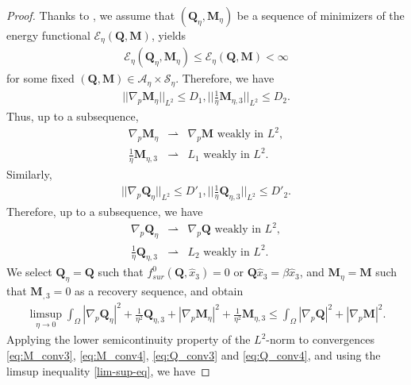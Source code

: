 \documentclass[10pt,a4paper]{amsart}
\def \Mvec{\mathbf{M}}
\def\Qvec{\mathbf{Q}}
\begin{document}
\begin{proof}
Thanks to , we assume that $\left(\Qvec_{\eta}, \Mvec_{\eta}\right)$ be a sequence of minimizers of the energy functional $\mathcal{E}_{\eta}\left(\Qvec, \Mvec\right)$, yields
\begin{eqnarray}
\mathcal{E}_{\eta}\left(\Qvec_{\eta}, \Mvec_{\eta}\right)\le\mathcal{E}_{\eta}\left(\Qvec, \Mvec\right)<\infty\label{eq:bound}
\end{eqnarray}
for some fixed $\left(\Qvec, \Mvec\right)\in \mathcal{A}_{\eta}\times\mathcal{S}_{\eta}$. Therefore, we have
\begin{eqnarray}
||\nabla_p\Mvec_{\eta}||_{L^2}\le D_1, \bigg|\bigg|\frac{1}{\eta}\Mvec_{\eta,3}\bigg|\bigg|_{L^2}\le D_2.\label{eq:M_conv1}
\end{eqnarray}
Thus, up to a subsequence,
\begin{eqnarray}
\nabla_p\Mvec_{\eta}&\rightharpoonup&\nabla_p\Mvec \mbox{ weakly in } L^2,\label{eq:M_conv3}\\
\frac{1}{\eta}\Mvec_{\eta,3}&\rightharpoonup& L_1  \mbox{ weakly in } L^2.\label{eq:M_conv4}
\end{eqnarray}
Similarly,
\begin{eqnarray}
||\nabla_p\Qvec_{\eta}||_{L^2}\le D'_1, \bigg|\bigg|\frac{1}{\eta}\Qvec_{\eta,3}\bigg|\bigg|_{L^2}\le D'_2.\label{eq:Q_conv2}
\end{eqnarray}
Therefore, up to a subsequence, we have
\begin{eqnarray}
\nabla_p\Qvec_{\eta}&\rightharpoonup&\nabla_p\Qvec \mbox{ weakly in } L^2,\label{eq:Q_conv3}\\
\frac{1}{\eta}\Qvec_{\eta,3}&\rightharpoonup& L_2  \mbox{ weakly in } L^2.\label{eq:Q_conv4}
\end{eqnarray}
We select $\Qvec_{\eta}=\Qvec$ such that $f^0_{sur}\left(\Qvec, \hat{x}_3\right)=0$ or $\Qvec\hat{x}_3=\beta\hat{x}_3$, and $\Mvec_{\eta}=\Mvec$ such that $\Mvec_{,3}=0$ as a recovery sequence, and obtain
\begin{eqnarray}
\limsup_{\eta\rightarrow 0}\int_{\Omega}|\nabla_p\Qvec_{\eta}|^2+\frac{1}{\eta^2}\Qvec_{\eta,3}+|\nabla_p\Mvec_{\eta}|^2+\frac{1}{\eta^2}\Mvec_{\eta,3}\le\int_{\Omega}|\nabla_p\Qvec|^2+|\nabla_p\Mvec|^2.\label{lim-sup-eq}
\end{eqnarray}
Applying the lower semicontinuity property of the $L^2$-norm to convergences \eqref{eq:M_conv3}, \eqref{eq:M_conv4}, \eqref{eq:Q_conv3} and \eqref{eq:Q_conv4}, and using the limsup inequality \eqref{lim-sup-eq}, we have

\end{proof}
\end{document}
